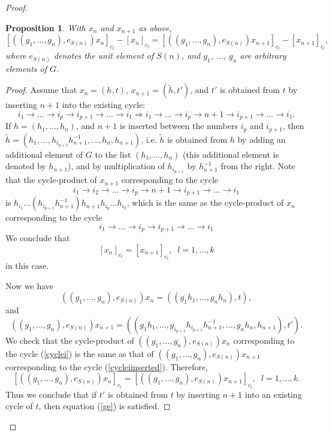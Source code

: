 \documentclass[12pt]{amsart}
\newtheorem{prop}[thm]{Proposition}
\theoremstyle{definition}
\numberwithin{equation}{section}
\begin{document}
\begin{proof}
\begin{prop}\label{PROPOSITIONCoW1} With $x_n$ and $x_{n+1}$ as above,
\begin{equation}\label{ge}
\left[\left(\left(g_1,\ldots,g_n\right),e_{S(n)}\right)x_n\right]_{c_l}-\left[x_n\right]_{c_l}
=\left[\left(\left(g_1,\ldots,g_n\right),e_{S(n)}\right)x_{n+1}\right]_{c_l}-\left[x_{n+1}\right]_{c_l},
\end{equation}
where $e_{S(n)}$ denotes the unit element of $S(n)$, and $g_1$, $\ldots$, $g_n$ are arbitrary elements of $G$.
\end{prop}
\begin{proof} Assume that $x_n=(h,t)$, $x_{n+1}=\left(\tilde{h},t'\right)$, and $t'$ is obtained from $t$ by inserting $n+1$ into the existing cycle:
$$
i_1\rightarrow \ldots\rightarrow i_p\rightarrow i_{p+1}\rightarrow\ldots\rightarrow i_1\Longrightarrow
i_1\rightarrow\ldots\rightarrow i_{p}\rightarrow n+1\rightarrow i_{p+1}\rightarrow\ldots\rightarrow i_1.
$$
If $h=\left(h_1,\ldots,h_n\right)$,  and $n+1$ is inserted between the numbers $i_p$ and $i_{p+1}$,
then $\tilde{h}=\left(h_1,\ldots,h_{i_{p+1}}h_{n+1}^{-1},\ldots,h_n,h_{n+1}\right)$,
i.e. $\tilde{h}$ is obtained from $h$ by adding an additional element of $G$ to the list $\left(h_1,\ldots,h_n\right)$
(this additional element is denoted by $h_{n+1}$), and by multiplication of $h_{i_{p+1}}$ by $h_{n+1}^{-1}$ from the right. Note that  the cycle-product of $x_{n+1}$ corresponding to the cycle
\begin{equation}\label{cycleiinserted}
i_1\rightarrow i_2\rightarrow\ldots\rightarrow i_{p}\rightarrow n+1\rightarrow i_{p+1}\rightarrow\ldots\rightarrow i_1
\end{equation}
is $h_{i_1}\ldots\left(h_{i_{p+1}}h_{n+1}^{-1}\right)h_{n+1}h_{i_p}\ldots h_{i_2}$,
which is the same as the cycle-product of $x_n$ corresponding to the cycle
\begin{equation}\label{cyclei}
i_1\rightarrow \ldots\rightarrow i_p\rightarrow i_{p+1}\rightarrow\ldots\rightarrow i_1
\end{equation}
We conclude that
$$
\left[x_n\right]_{c_l}=\left[x_{n+1}\right]_{c_l},\;\; l=1,\ldots, k
$$
in this case.

Now we have
\begin{equation}\label{4.13.a}
\left(\left(g_1,\ldots,g_n\right),e_{S(n)}\right)x_n=\left(\left(g_1h_1,\ldots,g_nh_n\right),t\right),
\end{equation}
and
$$
\left(\left(g_1,\ldots,g_n\right),e_{S(n)}\right)x_{n+1}
=\left(\left(g_1h_1,\ldots,g_{i_{p+1}}h_{i_{p+1}}h_{n+1}^{-1},\ldots,
g_nh_n,h_{n+1}\right),t'\right).
$$
We check that the cycle-product of $\left(\left(g_1,\ldots,g_n\right),e_{S(n)}\right)x_n$ corresponding to the
cycle (\ref{cyclei}) is the same as that of $\left(\left(g_1,\ldots,g_n\right),e_{S(n)}\right)x_{n+1}$
corresponding to the cycle (\ref{cycleiinserted}). Therefore,
$$
\left[\left(\left(g_1,\ldots,g_n\right),e_{S(n)}\right)x_n\right]_{c_l}
=\left[\left(\left(g_1,\ldots,g_n\right),e_{S(n)}\right)x_{n+1}\right]_{c_l}, \;\; l=1,\ldots, k.
$$
Thus we conclude that if $t'$ is obtained from $t$ by inserting $n+1$ into an existing cycle of $t$, then
equation  (\ref{ge}) is satisfied.


\end{proof}
\end{proof}
\end{document}

